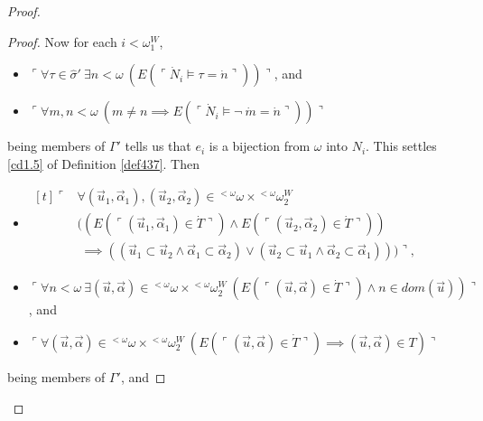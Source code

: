\documentclass[12pt]{article}
\numberwithin{equation}{section}
\begin{document}
\begin{proof}
\begin{proof}
Now for each $i < \omega_1^W$, 
\begin{itemize}
    \item $\ulcorner \forall \tau \in \hat{\sigma}' \ \exists n < \omega \ (E(\ulcorner \dot{N}_i \models \tau = \dot{n} \urcorner)) \urcorner$, and
    \item $\ulcorner \forall m, n < \omega \ (m \neq n \implies E(\ulcorner \dot{N}_i \models \neg \ \dot{m} = \dot{n} \urcorner)) \urcorner$
\end{itemize}
being members of $\Gamma'$ tells us that $e_i$ is a bijection from $\omega$ into $N_i$. This settles \ref{cd1.5} of Definition \ref{def437}. Then 
\begin{itemize}
    \item 
    \!
    $\begin{aligned}[t]
        \ulcorner & \forall (\Vec{u}_1, \Vec{\alpha}_1), (\Vec{u}_2, \Vec{\alpha}_2) \in {^{< \omega}{\omega}} \times {^{<\omega}{\omega_2^W}} \\
        & ((E(\ulcorner (\Vec{u}_1, \Vec{\alpha}_1) \in \dot{T} \urcorner) \wedge E(\ulcorner (\Vec{u}_2, \Vec{\alpha}_2) \in \dot{T} \urcorner)) \\
        & \mspace{5mu} \implies ((\Vec{u}_1 \subset \Vec{u}_2 \wedge \Vec{\alpha}_1 \subset \Vec{\alpha}_2) \vee (\Vec{u}_2 \subset \Vec{u}_1 \wedge \Vec{\alpha}_2 \subset \Vec{\alpha}_1))) \urcorner \text{,}
    \end{aligned}$
    \item $\ulcorner \forall n < \omega \ \exists (\Vec{u}, \Vec{\alpha}) \in {^{< \omega}{\omega}} \times {^{<\omega}{\omega_2^W}} \ (E(\ulcorner (\Vec{u}, \Vec{\alpha}) \in \dot{T} \urcorner) \wedge n \in dom(\Vec{u})) \urcorner$, and
    \item $\ulcorner \forall (\Vec{u}, \Vec{\alpha}) \in {^{< \omega}{\omega}} \times {^{< \omega}{\omega_2^W}} \ (E(\ulcorner (\Vec{u}, \Vec{\alpha}) \in \dot{T} \urcorner) \implies (\Vec{u}, \Vec{\alpha}) \in T) \urcorner$
\end{itemize}
being members of $\Gamma'$, and 
\end{proof}
\end{proof}
\end{document}
